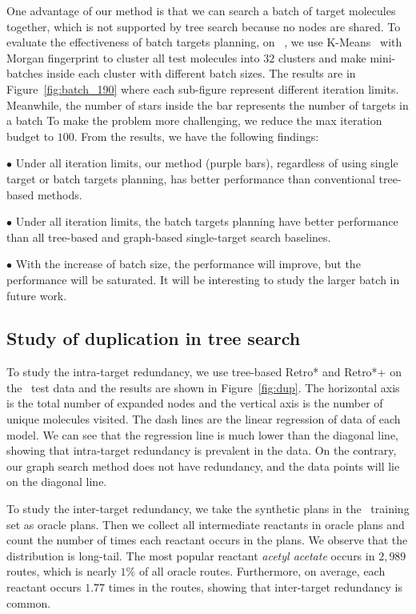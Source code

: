 \documentclass[sigconf]{acmart}
\begin{document}
One advantage of our method is that we can search a batch of target molecules together, which is not supported by tree search because no nodes are shared.
To evaluate the effectiveness of batch targets planning, on \uspto~, we use K-Means~\citep{lloyd1982} with Morgan fingerprint to cluster all test molecules into $32$ clusters and make mini-batches inside each cluster with different batch sizes.
The results are in Figure~\ref{fig:batch_190} where each sub-figure represent different iteration limits.
Meanwhile, the number of stars inside the bar represents the number of targets in a batch
To make the problem more challenging, we reduce the max iteration budget to $100$.
From the results, we have the following findings:

\noindent$\bullet$ Under all iteration limits, our method (purple bars), regardless of using single target or batch targets planning, has better performance than conventional tree-based methods.

\noindent$\bullet$ Under all iteration limits, the batch targets planning have better performance than all tree-based and graph-based single-target search baselines.

\noindent$\bullet$ With the increase of batch size, the performance will improve, but the performance will be saturated. It will be interesting to study the larger batch in future work.



\subsection{Study of duplication in tree search}\label{sec:res_study}
To study the intra-target redundancy, we use tree-based Retro* and Retro*+ on the \uspto~test data and the results are shown in Figure~\ref{fig:dup}.
The horizontal axis is the total number of expanded nodes and the vertical  axis is the number of unique molecules visited.
The dash lines are the linear regression of data of each model.
We can see that the regression line is much lower than the diagonal line, showing that intra-target redundancy is prevalent in the data.
On the contrary, our graph search method does not have redundancy, and the data points will lie on the diagonal line.



To study the inter-target redundancy, we take the synthetic plans in the \uspto~training set as oracle plans.
Then we collect all intermediate reactants in oracle plans and count the number of times each reactant occurs in the plans. 
We observe that the distribution is long-tail. The most popular reactant \textit{acetyl acetate} occurs in $2,989$ routes, which is nearly $1\%$ of all oracle routes.
Furthermore, on average, each reactant occurs $\mathbf{1.77}$ times in the routes, showing that inter-target redundancy is common.
\end{document}
